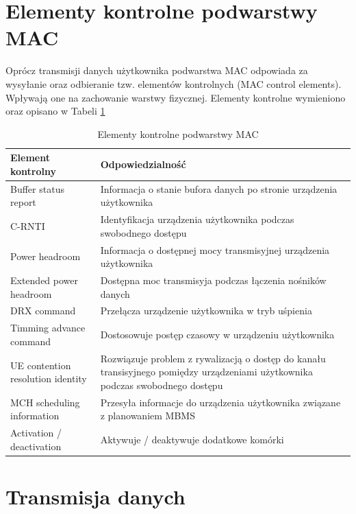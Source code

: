 \section{Elementy kontrolne podwarstwy MAC}
\label{sec:mac_control_elements}

Oprócz transmisji danych użytkownika podwarstwa MAC odpowiada za wysyłanie oraz odbieranie tzw. elementów kontrolnych (MAC control elements). Wpływają one na zachowanie warstwy fizycznej. Elementy kontrolne wymieniono oraz opisano w Tabeli \ref{tab:mac_control_elements}

\begin{center}
\begin{table}
	\begin{tabular}{ | m{8em} | m{30em} | }
		\hline
		Element kontrolny & Odpowiedzialność \\
		\hline
		Buffer status report & Informacja o stanie bufora danych po stronie urządzenia użytkownika \\
		\hline
		C-RNTI & Identyfikacja urządzenia użytkownika podczas swobodnego dostępu \\
		\hline
		Power headroom & Informacja o dostępnej mocy transmisyjnej urządzenia użytkownika \\
		\hline
		Extended power headroom & Dostępna moc transmisyja podczas łączenia nośników danych \\
		\hline
		DRX command & Przełącza urządzenie użytkownika w tryb uśpienia \\
		\hline
		Timming advance command & Dostosowuje postęp czasowy w urządzeniu użytkownika \\
		\hline
		UE contention resolution identity & Rozwiązuje problem z rywalizacją o dostęp do kanału transisyjnego pomiędzy urządzeniami użytkownika podczas swobodnego dostępu \\
		\hline
		MCH scheduling information & Przesyła informacje do urządzenia użytkownika związane z planowaniem MBMS \\
		\hline
		Activation / deactivation & Aktywuje / deaktywuje dodatkowe komórki \\
		\hline
	\end{tabular}
	\caption{Elementy kontrolne podwarstwy MAC}
	\label{tab:mac_control_elements}
\end{table}
\end{center}

\section{Transmisja danych}

